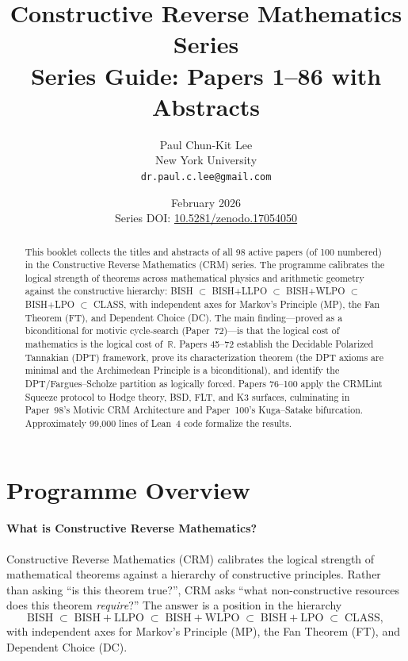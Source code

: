 \documentclass[11pt,a4paper]{article}
\title{\LARGE\bfseries Constructive Reverse Mathematics Series\\[0.3em]
\Large Series Guide: Papers 1--86 with Abstracts}
\author{Paul Chun-Kit Lee\\New York University\\
\texttt{dr.paul.c.lee@gmail.com}}
\date{February 2026\\[0.5em]
\normalsize Series DOI: \href{https://doi.org/10.5281/zenodo.17054050}{10.5281/zenodo.17054050}}
\begin{document}
\maketitle
\thispagestyle{empty}

\begin{abstract}
\noindent This booklet collects the titles and abstracts of all 98 active papers (of 100 numbered) in the Constructive Reverse Mathematics (CRM) series. The programme calibrates the logical strength of theorems across mathematical physics and arithmetic geometry against the constructive hierarchy: BISH $\subset$ BISH+LLPO $\subset$ BISH+WLPO $\subset$ BISH+LPO $\subset$ CLASS, with independent axes for Markov's Principle (MP), the Fan Theorem (FT), and Dependent Choice (DC). The main finding---proved as a biconditional for motivic cycle-search (Paper~72)---is that the logical cost of mathematics is the logical cost of~$\mathbb{R}$. Papers 45--72 establish the Decidable Polarized Tannakian (DPT) framework, prove its characterization theorem (the DPT axioms are minimal and the Archimedean Principle is a biconditional), and identify the DPT/Fargues--Scholze partition as logically forced. Papers 76--100 apply the CRMLint Squeeze protocol to Hodge theory, BSD, FLT, and K3 surfaces, culminating in Paper~98's Motivic CRM Architecture and Paper~100's Kuga--Satake bifurcation. Approximately 99,000 lines of Lean~4 code formalize the results.
\end{abstract}

\tableofcontents
\newpage

\part*{Programme Overview}

\subsection*{What is Constructive Reverse Mathematics?}

Constructive Reverse Mathematics (CRM) calibrates the logical strength of mathematical theorems against a hierarchy of constructive principles.  Rather than asking ``is this theorem true?'', CRM asks ``what non-constructive resources does this theorem \emph{require}?''  The answer is a position in the hierarchy
\[
\mathrm{BISH} \;\subset\; \mathrm{BISH{+}LLPO} \;\subset\; \mathrm{BISH{+}WLPO} \;\subset\; \mathrm{BISH{+}LPO} \;\subset\; \mathrm{CLASS},
\]
with independent axes for Markov's Principle (MP), the Fan Theorem (FT), and Dependent Choice (DC).
\end{document}
